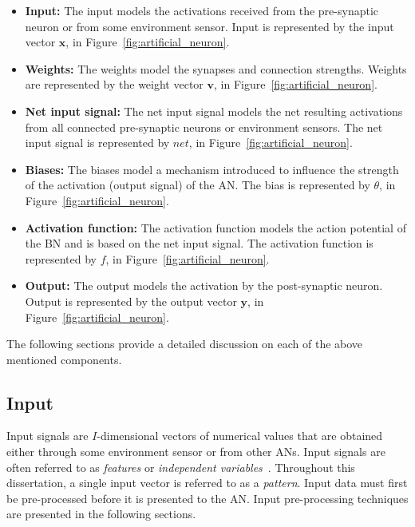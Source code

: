 \begin{itemize}
      \item \textbf{Input:} The input models the activations received from the pre-synaptic neuron or from some environment sensor. Input is represented by the input vector $\boldsymbol{x}$, in Figure~\ref{fig:artificial_neuron}.

      \item \textbf{Weights:} The weights model the synapses and connection strengths. Weights are represented by the weight vector $\boldsymbol{v}$, in Figure~\ref{fig:artificial_neuron}.

      \item {}\textbf{Net input signal:} The net input signal models the net resulting activations from all connected pre-synaptic neurons or environment sensors. The net input signal is represented by $net$, in Figure~\ref{fig:artificial_neuron}.

      \item \textbf{Biases:} The biases model a mechanism introduced to influence the strength of the activation (output signal) of the \acs{AN}. The bias is represented by $\theta$, in Figure~\ref{fig:artificial_neuron}.

      \item {}\textbf{Activation function:} The activation function models the action potential of the \acs{BN} and is based on the net input signal. The activation function is represented by $f$, in Figure~\ref{fig:artificial_neuron}.

      \item \textbf{Output:} The output models the activation by the post-synaptic neuron. Output is represented by the output vector $\boldsymbol{y}$, in Figure~\ref{fig:artificial_neuron}.
\end{itemize}

The following sections provide a detailed discussion on each of the above mentioned components.


\subsection{Input}\label{sec:anns:an:input}

Input signals are $I$-dimensional vectors of numerical values that are obtained either through some environment sensor or from other \acp{AN}. Input signals are often referred to as \textit{features} or \textit{independent variables}~\cite{ref:francis:2001}. Throughout this dissertation, a single input vector is referred to as a \textit{pattern}. Input data must first be pre-processed before it is presented to the \acs{AN}. Input pre-processing techniques are presented in the following sections.


